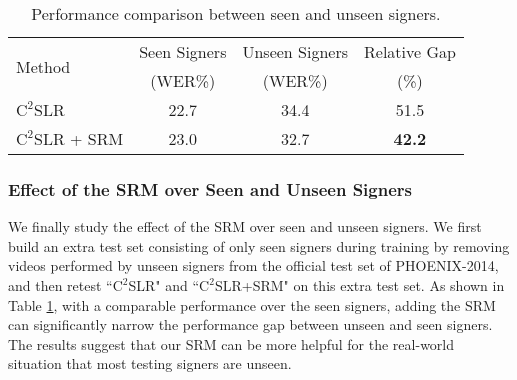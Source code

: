 \documentclass[acmsmall,screen]{acmart}
\begin{document}
\begin{table}[t]
\centering
\caption{Performance comparison between seen and unseen signers.}
\begin{tabular}{l|c|c|c}
\toprule
\multirow{2}{*}{Method} & Seen Signers & Unseen Signers & Relative Gap \\
& (WER\%) & (WER\%) & (\%) \\
\midrule
$\text{C}^2$SLR & 22.7 & 34.4 & 51.5 \\
$\text{C}^2$SLR + SRM & 23.0 & 32.7 & \textbf{42.2} \\
\bottomrule
\end{tabular}
\label{tab:srm_gap}
\end{table} \subsubsection{Effect of the SRM over Seen and Unseen Signers}
We finally study the effect of the SRM over seen and unseen signers. We first build an extra test set consisting of only seen signers during training by removing videos performed by unseen signers from the official test set of PHOENIX-2014, and then retest ``$\text{C}^2$SLR" and ``$\text{C}^2$SLR+SRM" on this extra test set. As shown in Table \ref{tab:srm_gap}, with a comparable performance over the seen signers, adding the SRM can significantly narrow the performance gap between unseen and seen signers. The results suggest that our SRM can be more helpful for the real-world situation that most testing signers are unseen.
\end{document}
